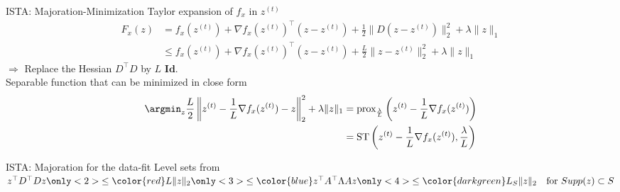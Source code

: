 \documentclass{beamer}
\begin{document}

\begin{frame}[t]{ISTA: Majoration-Minimization}
    Taylor expansion of $f_x$ in $z^{(t)}$
    \begin{align*}
        F_x(z) &  = f_x(z^{(t)}) + \nabla f_x(z^{(t)})^\top(z - z^{(t)})
                    + \frac{1}{2}\|D(z-z^{(t)})\|_2^2+ \lambda\|z\|_1\\
               & \le f_x(z^{(t)}) + \nabla f_x(z^{(t)})^\top(z - z^{(t)}) + \frac{L}{2}\|z - z^{(t)}\|_2^2 + \lambda\|z\|_1
    \end{align*}
    $\Rightarrow$ Replace the Hessian $D^\top D$ by $L \textbf{ Id}$.\\[2em]

    Separable function that can be minimized in close form
    \begin{align*}
        \argmin_z \frac{L}{2}\left\|z^{(t)} - \frac{1}{L}\nabla f_x(z^{(t)}) - z\right\|_2^2 + \lambda\|z\|_1
        & = \text{prox}_{\frac{\lambda}{L}}\left(z^{(t)} - \frac{1}{L}\nabla f_x(z^{(t)})\right)\\
        & = \text{ST}\left(z^{(t)} - \frac{1}{L}\nabla f_x(z^{(t)}),
                           \frac{\lambda}{L}\right)
    \end{align*}
\end{frame}

\begin{frame}{ISTA: Majoration for the data-fit}
    \myitem{} Level sets from $z^\top D^\top D z
                       \only<2>{\le \color{red} L \|z\|_2}
                       \only<3>{\le \color{blue} z^\top A^\top \Lambda A z}
                       \only<4>{\le {\color{darkgreen} L_S \|z\|_2}
                            ~~ \text{ for } Supp(z) \subset S}$
              \\
    \centering
    \\
\end{frame}
\end{document}
